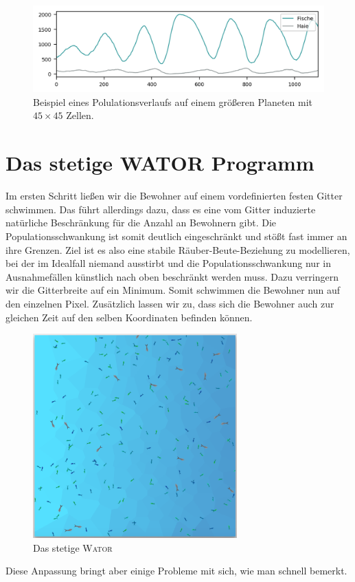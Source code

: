 \documentclass[a4paper,11pt]{article}
\newcommand{\wator}{\textsc{Wator}}
\theoremstyle{definition}
\numberwithin{equation}{section}
\begin{document}
	\begin{figure}
		\centering
		\includegraphics[width=\textwidth]{pictures/classic_big.png}
		\caption{Beispiel eines Polulationsverlaufs auf einem größeren Planeten mit $45 \times 45$ Zellen.}
		\label{fig:classic_big}
	\end{figure}

	\section{Das stetige WATOR Programm}
	Im ersten Schritt ließen wir die Bewohner auf einem vordefinierten festen Gitter schwimmen. Das führt allerdings dazu, dass es eine vom Gitter induzierte natürliche Beschränkung für die Anzahl an Bewohnern gibt. Die Populationsschwankung ist somit deutlich eingeschränkt und stößt fast immer an ihre Grenzen. Ziel ist es also eine stabile Räuber-Beute-Beziehung zu modellieren, bei der im Idealfall niemand ausstirbt und die Populationsschwankung nur in Ausnahmefällen künstlich nach oben beschränkt werden muss.
	Dazu verringern wir die Gitterbreite auf ein Minimum. Somit schwimmen die Bewohner nun auf den einzelnen Pixel. Zusätzlich lassen wir zu, dass sich die Bewohner auch zur gleichen Zeit auf den selben Koordinaten befinden können.
	\begin{figure}
		\centering
		\includegraphics[width=0.7\textwidth]{pictures/continuous.png}
		\caption{Das stetige \wator}
		\label{fig:continuous}
	\end{figure}
	Diese Anpassung bringt aber einige Probleme mit sich, wie man schnell bemerkt.\newline
	
\end{document}
